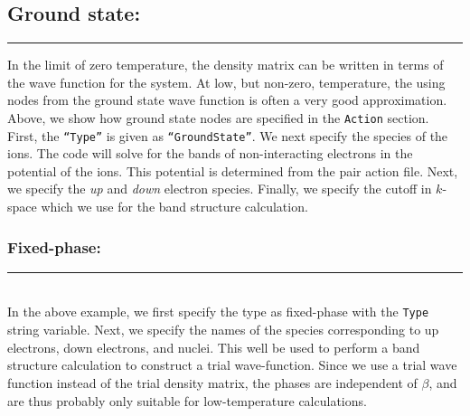 \documentclass{book}
\begin{document}
\subsection{Ground state:}
\rule{0.0cm}{0.75cm}\rule{0.6cm}{0cm}

In the limit of zero temperature, the density matrix can be written in
terms of the wave function for the system.  At low, but non-zero,
temperature, the using nodes from the ground state wave function is
often a very good approximation.  Above, we show how ground state
nodes are specified in the \texttt{Action} section.  First, the
\texttt{``Type''} is given as \texttt{``GroundState''}.  We next
specify the species of the ions.  The code will solve for the bands of
non-interacting electrons in the potential of the ions.  This
potential is determined from the pair action file.  Next, we specify
the {\em up} and {\em down} electron species.  Finally, we specify the
cutoff in $k$-space which we use for the band structure calculation.

\subsubsection{Fixed-phase:}
\rule{0.0cm}{0.75cm}\rule{0.6cm}{0cm}\\
In the above example, we first specify the type as fixed-phase with
the \texttt{Type} string variable.  Next, we specify the names of the
species corresponding to up electrons, down electrons, and nuclei.
This well be used to perform a band structure calculation to construct
a trial wave-function.  Since we use a trial wave function instead of
the trial density matrix, the phases are independent of $\beta$, and
are thus probably only suitable for low-temperature calculations.
\end{document}
